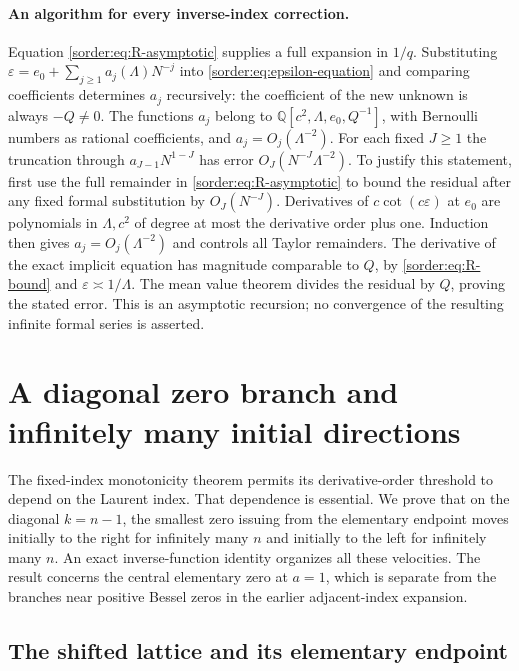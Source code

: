 \documentclass[11pt,a4paper]{article}
\theoremstyle{definition}
\theoremstyle{remark}
\numberwithin{equation}{section}
\begin{document}
\paragraph{An algorithm for every inverse-index correction.}
Equation \eqref{sorder:eq:R-asymptotic} supplies a full expansion in
$1/q$. Substituting
$\varepsilon=e_0+\sum_{j\ge1}a_j(\Lambda)N^{-j}$ into
\eqref{sorder:eq:epsilon-equation} and comparing coefficients determines
$a_j$ recursively: the coefficient of the new unknown is always
$-Q\ne0$. The functions $a_j$ belong to
$\mathbb Q[c^2,\Lambda,e_0,Q^{-1}]$, with Bernoulli numbers as rational
coefficients, and $a_j=O_j(\Lambda^{-2})$.
For each fixed $J\ge1$ the truncation through $a_{J-1}N^{1-J}$ has
error $O_J(N^{-J}\Lambda^{-2})$. To justify this statement, first use
the full remainder in \eqref{sorder:eq:R-asymptotic} to bound the
residual after any fixed formal substitution by $O_J(N^{-J})$.
Derivatives of $c\cot(c\varepsilon)$ at $e_0$ are polynomials in
$\Lambda,c^2$ of degree at most the derivative order plus one.
Induction then gives $a_j=O_j(\Lambda^{-2})$ and controls all Taylor
remainders. The derivative of the exact implicit equation has magnitude
comparable to $Q$, by \eqref{sorder:eq:R-bound} and
$\varepsilon\asymp1/\Lambda$. The mean value theorem divides the
residual by $Q$, proving the stated error. This is an asymptotic
recursion; no convergence of the resulting infinite formal series is asserted.



\section{A diagonal zero branch and infinitely many initial directions}
\label{diag:sec:main}

The fixed-index monotonicity theorem permits its derivative-order threshold
to depend on the Laurent index.  That dependence is essential.  We prove
that on the diagonal $k=n-1$, the smallest zero issuing from the elementary
endpoint moves initially to the right for infinitely many $n$ and initially
to the left for infinitely many $n$.  An exact inverse-function identity
organizes all these velocities.  The result concerns the central elementary
zero at $a=1$, which is separate from the branches near positive Bessel zeros
in the earlier adjacent-index expansion.

\subsection{The shifted lattice and its elementary endpoint}
\label{diag:subsec:lattice}
\end{document}
